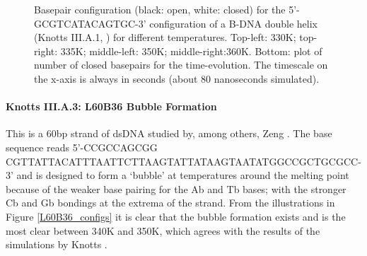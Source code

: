\begin{figure}[h] \begin{minipage}{7cm}
 \end{minipage} \begin{minipage}{7cm}  \end{minipage}
\begin{minipage}{7cm}
 \end{minipage} \begin{minipage}{7cm}\end{minipage}\begin{center}

\caption{Basepair configuration (black: open, white: closed) for the 5'-GCGTCATACAGTGC-3' configuration of a B-DNA double helix (Knotts III.A.1, \cite{knotts2007coarse}) for different temperatures. Top-left: 330K; top-right: 335K; middle-left: 350K; middle-right:360K. Bottom: plot of number of closed basepairs for the time-evolution. The timescale on the x-axis is always in seconds (about 80 nanoseconds simulated).  } \label{knotts1_configs}\end{center}
\end{figure}

\paragraph{Knotts III.A.3: L60B36 Bubble Formation} This is a 60bp strand of dsDNA studied by, among others, Zeng \etal \cite{zeng}. The base sequence reads 5'-CCGCCAGCGG CGTTATTACATTTAATTCTTAAGTATTATAAGTAATATGGCCGCTGCGCC-3' and is designed to form a `bubble' at temperatures around the melting point because of the weaker base pairing for the Ab and Tb bases; with the stronger Cb and Gb bondings at the extrema of the strand. From the illustrations in Figure \ref{L60B36_configs} it is clear that the bubble formation exists and is the most clear between 340K and 350K, which agrees with the results of the simulations by Knotts \etal \cite{knotts2007coarse}.

